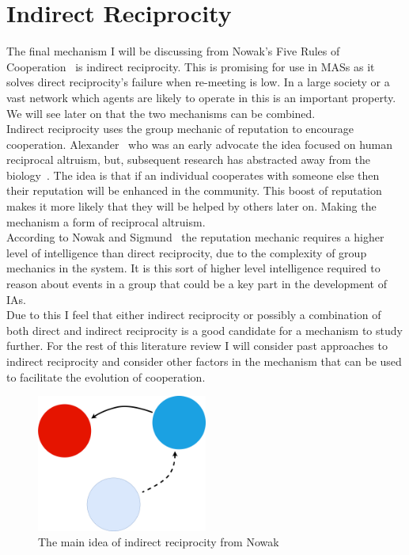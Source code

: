 \documentclass[]{final_report}
\begin{document}
\section{Indirect Reciprocity}
The final mechanism I will be discussing from Nowak's Five Rules of Cooperation~\cite{five_rules_coop} is indirect reciprocity. This is promising for use in MASs as it solves direct reciprocity's failure when re-meeting is low. In a large society or a vast network which agents are likely to operate in this is an important property. We will see later on that the two mechanisms can be combined.\\
Indirect reciprocity uses the group mechanic of reputation to encourage cooperation. Alexander~\cite{alexander1987biology} who was an early advocate the idea focused on human reciprocal altruism, but, subsequent research has abstracted away from the biology~\cite{phelps_game_theoretic_analysis, imagevsstanding, evol_indirect_image, evoldirindir, five_rules_coop, leimarhammer, sugden2004economics, gossip_alt, mui2002computational}. The idea is that if an individual cooperates with someone else then their reputation will be enhanced in the community. This boost of reputation makes it more likely that they will be helped by others later on. Making the mechanism a form of reciprocal altruism.\\
According to Nowak and Sigmund~\cite{evol_indirect_image} the reputation mechanic requires a higher level of intelligence than direct reciprocity, due to the complexity of group mechanics in the system. It is this sort of higher level intelligence required to reason about events in a group that could be a key part in the development of IAs.\\
Due to this I feel that either indirect reciprocity or possibly a combination of both direct and indirect reciprocity is a good candidate for a mechanism to study further. For the rest of this literature review I will consider past approaches to indirect reciprocity and consider other factors in the mechanism that can be used to facilitate the evolution of cooperation.
\begin{figure}
	\center
	\includegraphics[width=0.5\textwidth]{IndirectRec.png}
	\caption{The main idea of indirect reciprocity from Nowak~\cite{five_rules_coop}}
	\label{fig:indir_rec}
\end{figure}
\end{document}
